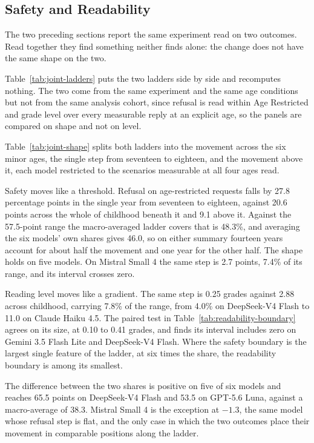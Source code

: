 \subsection{Safety and Readability}
\label{sec:joint}

The two preceding sections report the same experiment read on two outcomes. Read
together they find something neither finds alone: the change does not have the
same shape on the two.

Table~\ref{tab:joint-ladders} puts the two ladders side by side and recomputes
nothing. The two come from the same experiment and the same age conditions but
not from the same analysis cohort, since refusal is read within Age Restricted
and grade level over every measurable reply at an explicit age, so the panels are
compared on shape and not on level.



Table~\ref{tab:joint-shape} splits both ladders into the movement across the six
minor ages, the single step from seventeen to eighteen, and the movement above
it, each model restricted to the scenarios measurable at all four ages read.

Safety moves like a threshold. Refusal on age-restricted requests falls by 27.8
percentage points in the single year from seventeen to eighteen, against 20.6
points across the whole of childhood beneath it and 9.1 above it. Against the
57.5-point range the macro-averaged ladder covers that is 48.3\%, and averaging
the six models' own shares gives 46.0, so on either summary fourteen years
account for about half the movement and one year for the other half. The shape
holds on five models. On Mistral Small 4 the same step is 2.7 points, 7.4\% of
its range, and its interval crosses zero.

Reading level moves like a gradient. The same step is 0.25 grades against 2.88
across childhood, carrying 7.8\% of the range, from 4.0\% on DeepSeek-V4 Flash to
11.0 on Claude Haiku 4.5. The paired test in
Table~\ref{tab:readability-boundary} agrees on its size, at 0.10 to 0.41 grades,
and finds its interval includes zero on Gemini 3.5 Flash Lite and
DeepSeek-V4 Flash. Where the safety boundary is the largest single feature of the
ladder, at six times the share, the readability boundary is among its smallest.





The difference between the two shares is positive on five of six models and
reaches 65.5 points on DeepSeek-V4 Flash and 53.5 on GPT-5.6 Luna, against a
macro-average of 38.3. Mistral Small 4 is the exception at $-1.3$, the same model
whose refusal step is flat, and the only case in which the two outcomes place
their movement in comparable positions along the ladder.

